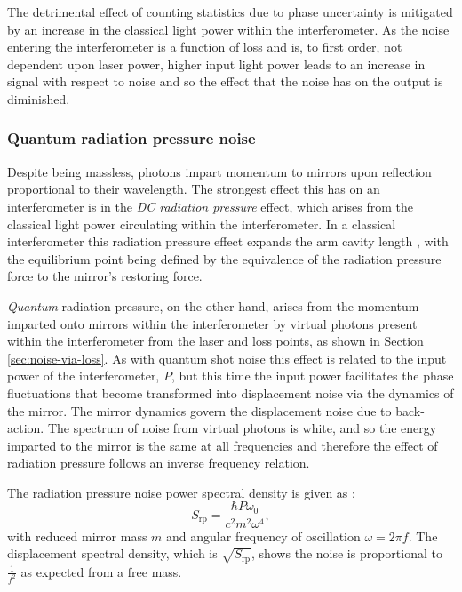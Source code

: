 The detrimental effect of counting statistics due to phase uncertainty is mitigated by an increase in the classical light power within the interferometer. As the noise entering the interferometer is a function of loss and is, to first order, not dependent upon laser power, higher input light power leads to an increase in signal with respect to noise and so the effect that the noise has on the output is diminished.

\subsubsection{Quantum radiation pressure noise}
Despite being massless, photons impart momentum to mirrors upon reflection proportional to their wavelength. The strongest effect this has on an interferometer is in the \emph{\gls{DC} radiation pressure} effect, which arises from the classical light power circulating within the interferometer. In a classical interferometer this radiation pressure effect expands the arm cavity length , with the equilibrium point being defined by the equivalence of the radiation pressure force to the mirror's restoring force.

\emph{Quantum} radiation pressure, on the other hand, arises from the momentum imparted onto mirrors within the interferometer by virtual photons present within the interferometer from the laser and loss points, as shown in Section\,\ref{sec:noise-via-loss}. As with quantum shot noise this effect is related to the input power of the interferometer, $P$, but this time the input power facilitates the phase fluctuations that become transformed into displacement noise via the dynamics of the mirror. The mirror dynamics govern the displacement noise due to back-action. The spectrum of noise from virtual photons is white, and so the energy imparted to the mirror is the same at all frequencies and therefore the effect of radiation pressure follows an inverse frequency relation.

The radiation pressure noise power spectral density is given as \cite{Danilishin2012}:
\begin{equation}
  \label{eq:rp-noise-psd}
  S_{\text{rp}} = \frac{\hbar P \omega_0}{c^2 m^2 \omega^4},
\end{equation}
with reduced mirror mass $m$ and angular frequency of oscillation $\omega = 2 \pi f$. The displacement spectral density, which is $\sqrt{S_{\text{rp}}}$, shows the noise is proportional to $\frac{1}{f^2}$ as expected from a free mass.

